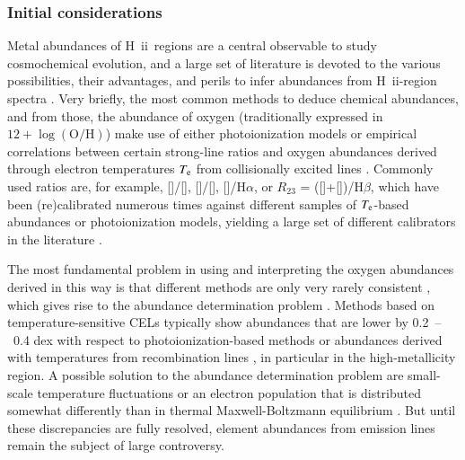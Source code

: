 \documentclass[traditabstract]{aa}
\newcommand{\hb}{H$\beta$}
\newcommand{\ha}{H$\alpha$}
\newcommand{\hii}{\mbox{H~{\sc ii}}}
\newcommand{\oh}{12+\log(\mathrm{O/H})}
\newcommand{\oii}{[\ion{O}{ii}]}
\newcommand{\oiii}{[\ion{O}{iii}]}
\newcommand{\nii}{[\ion{N}{ii}]}
\begin{document}
\subsubsection{Initial considerations}

Metal abundances of \hii\  regions are a central observable to study cosmochemical evolution, and a large set of literature is devoted to the various possibilities, their advantages, and perils to infer abundances from \hii-region spectra \citep[e.g.,][]{1979MNRAS.189...95P, 1991ApJ...380..140M, 2005ApJ...631..231P, 2008ApJ...681.1183K}. Very briefly, the most common methods to deduce chemical abundances, and from those, the abundance of oxygen (traditionally expressed in $\oh$) make use of either photoionization models \citep[e.g.,][]{1985ApJS...58..125E, 2000ApJ...542..224D, 2002ApJS..142...35K} or empirical correlations between certain strong-line ratios and oxygen abundances derived through electron temperatures $T_{\rm{e}}$ from collisionally excited lines \citep[CELs; e.g.,][]{2004MNRAS.348L..59P, 2013A&A...559A.114M}. Commonly used ratios are, for example, \nii/\oii, \oiii/\nii,  \nii/\ha, or $R_{23}$ = (\oii+\oiii)/\hb, which have been (re)calibrated numerous times against different samples of $T_{\rm{e}}$-based abundances or photoionization models, yielding a large set of different calibrators in the literature \citep[e.g.,][]{2002ApJS..142...35K, 2004ApJ...617..240K, 2005ApJ...631..231P, 2006A&A...459...85N, 2008A&A...488..463M}.

The most fundamental problem in using and interpreting the oxygen abundances derived in this way is that different methods are only very rarely consistent \citep[e.g.,][]{2008ApJ...681.1183K}, which gives rise to the abundance determination problem \citep{1967ApJ...150..825P}. Methods based on temperature-sensitive CELs typically show abundances that are lower by 0.2~--~0.4 dex with respect to photoionization-based methods or abundances derived with temperatures from recombination lines \citep[e.g.,][and references therein]{2012MNRAS.426.2630L}, in particular in the high-metallicity region. A possible solution to the abundance determination problem are small-scale temperature fluctuations \citep[e.g.,][]{2003ApJ...584..735P, 2004MNRAS.355..229E} or an electron population that is distributed somewhat differently than in thermal Maxwell-Boltzmann equilibrium \citep{2012ApJ...752..148N, 2012MNRAS.426.2630L}. But until these discrepancies are fully resolved, element abundances from emission lines remain the subject of large controversy.
\end{document}
